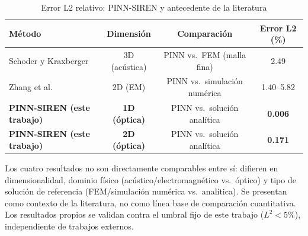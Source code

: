 \begin{table}[htbp]
\centering
\begin{threeparttable}
\caption{Error L2 relativo: PINN-SIREN y antecedente de la literatura}
\label{tab:comparativa}
\begin{tabular}{lccc}
\toprule
Método & Dimensión & Comparación & Error L2 (\%) \\
\midrule
Schoder y Kraxberger~\cite{Schoder2024_PINN_acoustics} & 3D (acústica) & PINN vs.\ FEM (malla fina) & 2.49 \\
Zhang et al.~\cite{Zhang2025_FEPIRBN} & 2D (EM) & PINN vs.\ simulación numérica & 1.40--5.82 \\
\textbf{PINN-SIREN (este trabajo)} & \textbf{1D (óptica)} & PINN vs.\ solución analítica & \textbf{0.006} \\
\textbf{PINN-SIREN (este trabajo)} & \textbf{2D (óptica)} & PINN vs.\ solución analítica & \textbf{0.171} \\
\bottomrule
\end{tabular}
\begin{tablenotes}
\small
\item Los cuatro resultados no son directamente comparables entre sí: difieren en
      dimensionalidad, dominio físico (acústico/electromagnético vs.\ óptico) y tipo de
      solución de referencia (FEM/simulación numérica vs.\ analítica). Se presentan como
      contexto de la literatura, no como línea base de comparación cuantitativa. Los
      resultados propios se validan contra el umbral fijo de este trabajo ($L^2 < 5\%$),
      independiente de trabajos externos.
\end{tablenotes}
\end{threeparttable}
\end{table}
